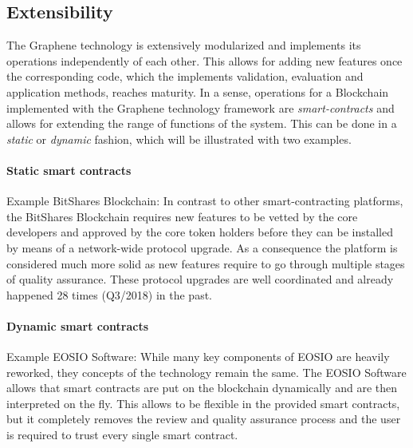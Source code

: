 \subsection{Extensibility }

The Graphene technology is extensively modularized and implements its operations independently of each other. This allows for adding new features once the corresponding code, which the implements validation, evaluation and application methods, reaches maturity. In a sense, operations for a Blockchain implemented with the Graphene technology framework are \emph{smart-contracts} and allows for extending the range of functions of the system. This can be done in a \emph{static} or \emph{dynamic} fashion, which will be illustrated with two examples.

\paragraph{Static smart contracts} Example BitShares Blockchain: In contrast to other smart-contracting platforms, the BitShares Blockchain requires new features to be vetted by the core developers and approved by the core token holders before they can be installed by means of a network-wide protocol upgrade. As a consequence the platform is considered much more solid as new features require to go through multiple stages of quality assurance. These protocol upgrades are well coordinated and already happened 28 times (Q3/2018) in the past.

\paragraph{Dynamic smart contracts} Example EOSIO Software: While many key components of EOSIO are heavily reworked, they concepts of the technology remain the same. The EOSIO Software allows that smart contracts are put on the blockchain dynamically and are then interpreted on the fly. This allows to be flexible in the provided smart contracts, but it completely removes the review and quality assurance process and the user is required to trust every single smart contract.

